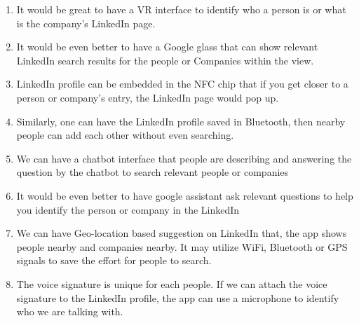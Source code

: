\documentclass[
	letterpaper, %
]{jdf}
\begin{document}
\begin{enumerate}
    \item It would be great to have a VR interface to identify who a person is or what is the company's LinkedIn page. 
    \item It would be even better to have a Google glass that can show relevant LinkedIn search results for the people or Companies within the view.
    \item LinkedIn profile can be embedded in the NFC chip that if you get closer to a person or company's entry, the LinkedIn page would pop up.
    \item Similarly, one can have the LinkedIn profile saved in Bluetooth, then nearby people can add each other without even searching.
    \item We can have a chatbot interface that people are describing and answering the question by the chatbot to search relevant people or companies
    \item It would be even better to have google assistant ask relevant questions to help you identify the person or company in the LinkedIn
    \item We can have Geo-location based suggestion on LinkedIn that, the app shows people nearby and companies nearby. It may utilize WiFi, Bluetooth or GPS signals to save the effort for people to search.
    \item The voice signature is unique for each people. If we can attach the voice signature to the LinkedIn profile, the app can use a microphone to identify who we are talking with.
\end{enumerate}
\end{document}
